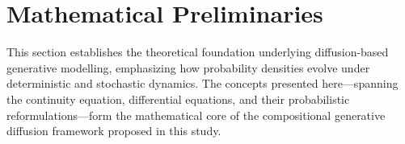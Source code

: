 \section{Mathematical Preliminaries}
\label{sec:math_prelim}

This section establishes the theoretical foundation underlying diffusion-based generative modelling, emphasizing how probability densities evolve under deterministic and stochastic dynamics. The concepts presented here—spanning the continuity equation, differential equations, and their probabilistic reformulations—form the mathematical core of the compositional generative diffusion framework proposed in this study.






